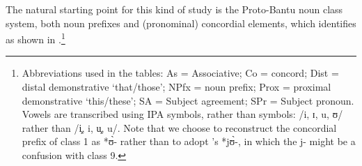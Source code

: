 \documentclass[output=paper,,modfonts,nonflat]{langsci/langscibook}
\begin{document}
The natural starting point for this kind of study is the Proto-Bantu noun class system, both noun prefixes and (pronominal) concordial elements, which  identifies as shown in .\footnote{Abbreviations used in the tables: As = Associative; Co = concord; Dist = distal demonstrative `that/those'; NPfx = noun prefix; Prox = proximal demonstrative `this/these'; SA = Subject agreement; SPr = Subject pronoun. Vowels are transcribed using IPA symbols, rather than  symbols: /i, ɪ, u, ʊ/ rather than /i̧, i, u̧, u/. Note that we choose to reconstruct the concordial prefix of class 1 as *ʊ̀- rather than to adopt 's  *jʊ̀-, in which the j- might be a confusion with class 9.}

\end{document}
